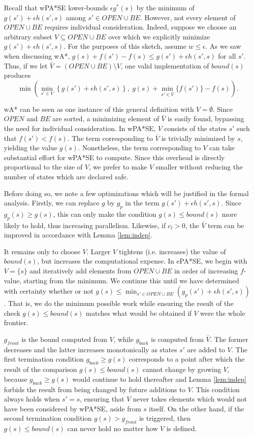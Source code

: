 \documentclass[letterpaper]{article}
\begin{document}
Recall that wPA*SE lower-bounds $\epsilon g^*(s)$ by the minimum of $g(s') + \epsilon h(s',s)$ among $s'\in OPEN\cup BE$. However, not every element of $OPEN\cup BE$ requires individual consideration. Indeed, suppose we choose an arbitrary subset $V\subseteq OPEN\cup BE$ over which we explicitly minimize $g(s') + \epsilon h(s',s)$. For the purposes of this sketch, assume $w\le\epsilon$. As we saw when discussing wA*, $g(s) + f(s') - f(s) \le g(s') + \epsilon h(s',s)$ for all $s'$. Thus, if we let $\bar V = (OPEN\cup BE)\setminus V$, one valid implementation of $bound(s)$ produces 
\[\min\left(\min_{s'\in V}\left\{g(s') + \epsilon h(s',s)\right\},\;g(s) + \min_{s'\in\bar V} \{f(s')\} - f(s)  \right).\]

wA* can be seen as one instance of this general definition with $V = \emptyset$. Since $OPEN$ and $BE$ are sorted, a minimizing element of $\bar V$ is easily found, bypassing the need for individual consideration. In wPA*SE, $V$ consists of the states $s'$ such that $f(s') < f(s)$. The term corresponding to $\bar V$ is trivially minimized by $s$, yielding the value $g(s)$. Nonetheless, the term corresponding to $V$ can take substantial effort for wPA*SE to compute. Since this overhead is directly proportional to the size of $V$, we prefer to make $V$ smaller without reducing the number of states which are declared safe.

Before doing so, we note a few optimizations which will be justified in the formal analysis. Firstly, we can replace $g$ by $g_p$ in the term $g(s') + \epsilon h(s',s)$. Since $g_p(s) \ge g(s)$, this can only make the condition $g(s) \le bound(s)$ more likely to hold, thus increasing parallelism. Likewise, if $c_l > 0$, the $\bar V$ term can be improved in accordance with Lemma \ref{lem:indep}.

It remains only to choose $V$. Larger $V$ tightens (i.e. increases) the value of $bound(s)$, but increases the computational expense. In ePA*SE, we begin with $V = \{s\}$ and iteratively add elements from $OPEN\cup BE$ in order of increasing $f$-value, starting from the minimum. We continue this until we have determined with certainty whether or not $g(s) \le \min_{s'\in OPEN\cup BE}\left(g_p(s') + \epsilon h(s',s)\right)$. That is, we do the minimum possible work while ensuring the result of the check $g(s) \le bound(s)$ matches what would be obtained if $V$ were the whole frontier.

$g_{front}$ is the bound computed from $V$, while $g_{back}$ is computed from $\bar V$. The former decreases and the latter increases monotonically as states $s'$ are added to $V$. The first termination condition $g_{back} \ge g(s)$ corresponds to a point after which the result of the comparison $g(s) \le bound(s)$ cannot change by growing $V$, because $g_{back} \ge g(s)$ would continue to hold thereafter and Lemma \ref{lem:indep} forbids the result from being changed by future additions to $V$. This condition always holds when $s' = s$, ensuring that $V$ never takes elements which would not have been considered by wPA*SE, aside from $s$ itself. On the other hand, if the second termination condition $g(s) > g_{front}$ is triggered, then $g(s) \le bound(s)$ can never hold no matter how $V$ is defined.
\end{document}

